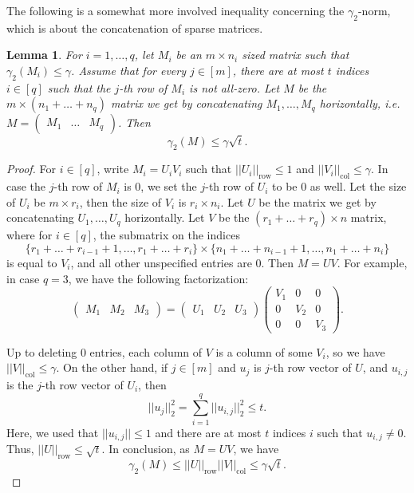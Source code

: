 \documentclass[11pt]{article}
\theoremstyle{plain}
\newtheorem{lemma}[theorem]{Lemma}
\theoremstyle{definition}
\begin{document}
	The following is a somewhat more involved inequality concerning the $\gamma_2$-norm, which is about the concatenation of sparse matrices.
	
	\begin{lemma}\label{lemma:concatenation}
		For $i=1,\dots,q$, let $M_i$ be an $m\times n_i$ sized matrix such that $\gamma_2(M_i)\leq \gamma$.  Assume that for every $j\in [m]$, there are at most $t$ indices $i\in [q]$ such that the $j$-th row of $M_i$ is not all-zero. Let $M$ be the $m\times (n_1+\dots+n_q)$ matrix we get by concatenating $M_1,\dots,M_q$ horizontally, i.e. $M=\begin{pmatrix}
			M_1 & \dots & M_q
		\end{pmatrix}$. Then
		$$\gamma_2(M)\leq \gamma\sqrt{t}.$$
	\end{lemma}
	
	\begin{proof}
		For $i\in [q]$, write $M_i=U_iV_i$ such that $||U_i||_{\text{row}}\leq 1$ and $||V_i||_{\text{col}}\leq \gamma$. In case the $j$-th row of $M_i$ is 0, we set the $j$-th row of $U_i$ to be 0 as well. Let the size of $U_i$ be $m\times r_i$, then the size of $V_i$ is $r_i\times n_i$. Let $U$ be the matrix we get by concatenating $U_1,\dots,U_q$ horizontally. Let $V$ be the $(r_1+\dots+r_q)\times n$ matrix, where for $i\in [q]$, the submatrix on the indices $$\{r_1+\dots+r_{i-1}+1,\dots,r_1+\dots+r_i\}\times \{n_1+\dots+n_{i-1}+1,\dots,n_1+\dots+n_i\}$$ is equal to $V_i$, and all other unspecified entries are 0. Then $M=UV$. For example, in case $q=3$, we have the following factorization:
		$$\begin{pmatrix} M_1 & M_2 & M_3 \end{pmatrix}=\begin{pmatrix} U_1 & U_2 & U_3\end{pmatrix}\begin{pmatrix}
			V_1 & 0 & 0\\ 0 & V_2 & 0 \\ 0 & 0 & V_3
		\end{pmatrix}.$$
		
		Up to deleting 0 entries, each column of $V$ is a column of some $V_i$, so we have $||V||_{\text{col}}\leq \gamma$. On the other hand, if $j\in [m]$ and $u_j$ is $j$-th row vector of $U$, and $u_{i,j}$ is the $j$-th row vector of $U_i$, then
		$$||u_j||_2^2=\sum_{i=1}^q ||u_{i,j}||_2^2\leq t.$$
		Here, we used that $||u_{i,j}||\leq 1$ and there are at most $t$ indices $i$ such that $u_{i,j}\neq 0$. Thus, $||U||_{\text{row}}\leq \sqrt{t}$. In conclusion, as $M=UV$, we have $$\gamma_2(M)\leq ||U||_{\text{row}}||V||_{\text{col}}\leq \gamma\sqrt{t}.$$
	\end{proof}
	
\end{document}
